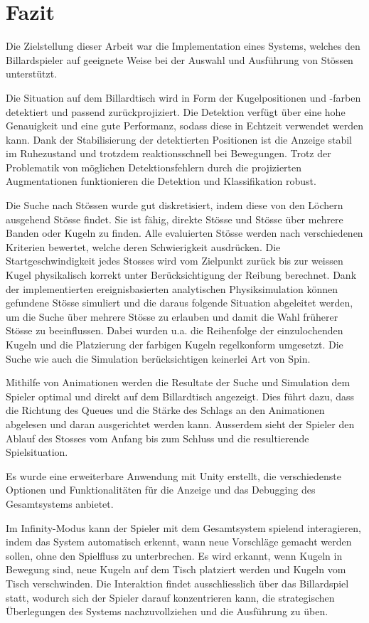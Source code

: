 \chapter{Fazit}\label{kap:fazit}
Die Zielstellung dieser Arbeit war die Implementation eines Systems, welches den Billardspieler auf geeignete Weise bei der Auswahl und Ausführung von Stössen unterstützt.

Die Situation auf dem Billardtisch wird in Form der Kugelpositionen und -farben detektiert und passend zurückprojiziert.
Die Detektion verfügt über eine hohe Genauigkeit und eine gute Performanz, sodass diese in Echtzeit verwendet werden kann.
Dank der Stabilisierung der detektierten Positionen ist die Anzeige stabil im Ruhezustand und trotzdem reaktionsschnell bei Bewegungen.
Trotz der Problematik von möglichen Detektionsfehlern durch die projizierten Augmentationen funktionieren die Detektion und Klassifikation robust.

Die Suche nach Stössen wurde gut diskretisiert, indem diese von den Löchern ausgehend Stösse findet.
Sie ist fähig, direkte Stösse und Stösse über mehrere Banden oder Kugeln zu finden.
Alle evaluierten Stösse werden nach verschiedenen Kriterien bewertet, welche deren Schwierigkeit ausdrücken.
Die Startgeschwindigkeit jedes Stosses wird vom Zielpunkt zurück bis zur weissen Kugel physikalisch korrekt unter Berücksichtigung der Reibung berechnet.
Dank der implementierten ereignisbasierten analytischen Physiksimulation können gefundene Stösse simuliert und die daraus
folgende Situation abgeleitet werden, um die Suche über mehrere Stösse zu erlauben und damit die Wahl früherer Stösse zu beeinflussen.
Dabei wurden u.a. die Reihenfolge der einzulochenden Kugeln und die Platzierung der farbigen Kugeln regelkonform umgesetzt.
Die Suche wie auch die Simulation berücksichtigen keinerlei Art von Spin.

Mithilfe von Animationen werden die Resultate der Suche und Simulation dem Spieler optimal und direkt auf dem Billardtisch angezeigt.
Dies führt dazu, dass die Richtung des Queues und die Stärke des Schlags an den Animationen abgelesen und daran ausgerichtet werden kann.
Ausserdem sieht der Spieler den Ablauf des Stosses vom Anfang bis zum Schluss und die resultierende Spielsituation.

Es wurde eine erweiterbare Anwendung mit Unity erstellt, die verschiedenste Optionen und Funktionalitäten
für die Anzeige und das Debugging des Gesamtsystems anbietet.

Im Infinity-Modus kann der Spieler mit dem Gesamtsystem spielend interagieren, indem das System automatisch erkennt, wann
neue Vorschläge gemacht werden sollen, ohne den Spielfluss zu unterbrechen.
Es wird erkannt, wenn Kugeln in Bewegung sind, neue Kugeln auf dem Tisch platziert werden und Kugeln vom Tisch verschwinden.
Die Interaktion findet ausschliesslich über das Billardspiel statt, wodurch sich der Spieler darauf konzentrieren kann,
die strategischen Überlegungen des Systems nachzuvollziehen und die Ausführung zu üben.

